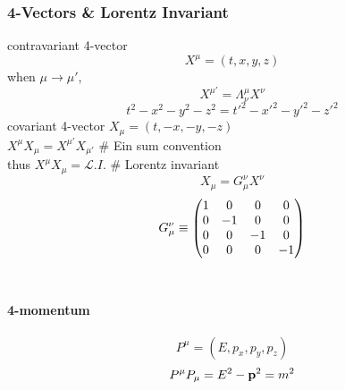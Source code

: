 \documentclass[a4paper]{article}
\DeclareMathOperator{\ra}{\rightarrow}
\numberwithin{equation}{section}
\begin{document}
\subsubsection{4-Vectors \& Lorentz Invariant}
contravariant 4-vector
\begin{equation}\label{key}
X^\mu = (t,x,y,z)
\end{equation}
when $ \mu \ra \mu' $, 
\begin{equation}\label{key}
X^{\mu'} = \Lambda^\mu_\nu X^\nu
\end{equation}
\begin{equation}\label{key}
t^2 - x^2 - y^2 - z^2 = t'^2 - x'^2 - y'^2 - z'^2
\end{equation}
covariant 4-vector $ X_\mu = (t,-x,-y,-z) $\\
$ X^\mu X_\mu = X^{\mu'} X_{\mu'} $ \# Ein sum convention\\
thus $ X^\mu X_\mu = \mathscr{L}.I. $ \# Lorentz invariant\\
\begin{equation}\label{key}
X_\mu = G_\mu^\nu X^\nu
\end{equation}
\begin{equation}\label{key}
G_\mu^\nu \equiv \mqty( 1 & 0 & 0 & 0\\
                        0 & -1 & 0 & 0\\
                        0 & 0 & -1 & 0\\
                        0 & 0 & 0 & -1)
\end{equation}
~\\
\paragraph{4-momentum}
\begin{equation}\label{key}
P^\mu = (E, p_x, p_y, p_z)
\end{equation}
\begin{equation}\label{key}
P^\mu P_\mu = E^2 - \vb{p}^2 = m^2
\end{equation}
\end{document}
